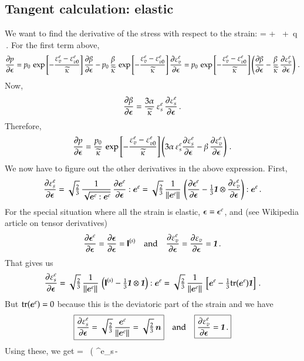 \documentclass[twoside,10pt,a4paper]{article}
\begin{document}
\subsection{Tangent calculation: elastic}
We want to find the derivative of the stress with respect to the strain:
\Beq
   \Partial{\Bsig}{\Beps} = \Bone\otimes{} + 
      \,\BnT\otimes{} + 
      \,q\,\Partial{\BnT}{\Beps}  \,.
\Eeq
For the first term above,
\[
   \Partial{p}{\Beps} = p_0\,\exp\left[-\frac{\Ve^e_v - \Ve^e_{v0}}{\kappatilde}\right]\Partial{\beta}{\Beps}
      - p_0\,\frac{\beta}{\kappatilde}\,
        \exp\left[-\frac{\Ve^e_v - \Ve^e_{v0}}{\kappatilde}\right]\Partial{\Ve^e_v}{\Beps} 
     = p_0\,\exp\left[-\frac{\Ve^e_v - \Ve^e_{v0}}{\kappatilde}\right]\left(\Partial{\beta}{\Beps} -
            \frac{\beta}{\kappatilde}\,\Partial{\Ve^e_v}{\Beps} \right) \,.
\]
Now,
\[
   \Partial{\beta}{\Beps} = \frac{3\alpha}{\kappatilde}\,\Ve^e_s\,\Partial{\Ve^e_s}{\Beps} \,.
\]
Therefore, 
\[
  \Partial{p}{\Beps} = \frac{p_0}{\kappatilde}\,
      \exp\left[-\frac{\Ve^e_v - \Ve^e_{v0}}{\kappatilde}\right]\left(3\alpha\,\Ve^e_s\Partial{\Ve^e_s}{\Beps} -
            \beta\,\Partial{\Ve^e_v}{\Beps} \right) \,.
\]
We now have to figure out the other derivatives in the above expression.  First,
\[
  \Partial{\Ve^e_s}{\Beps} = \sqrt{\tfrac{2}{3}}\,\frac{1}{\sqrt{\BeT^e:\BeT^e}}\,\Partial{\BeT^e}{\Beps}:\BeT^e =
     \sqrt{\tfrac{2}{3}}\,\frac{1}{\Norm{\BeT^e}{}}\,
     \left(\Partial{\Beps^e}{\Beps} - \tfrac{1}{3}\Bone\otimes\Partial{\Ve^e_v}{\Beps} \right):\BeT^e\,.
\]
For the special situation where all the strain is elastic, $\Beps = \Beps^e$, and (see Wikipedia 
article on tensor derivatives)
\[
  \Partial{\Beps^e}{\Beps} = \Partial{\Beps}{\Beps} = \SfI^{(s)} \quad \Tand \quad
  \Partial{\Ve^e_v}{\Beps} = \Partial{\Ve_v}{\Beps} = \Bone \,.
\]
That gives us
\[
  \Partial{\Ve^e_s}{\Beps} = \sqrt{\tfrac{2}{3}}\,\frac{1}{\Norm{\BeT^e}{}}\,
     \left(\SfI^{(s)} - \tfrac{1}{3}\Bone\otimes\Bone \right):\BeT^e
   = \sqrt{\tfrac{2}{3}}\,\frac{1}{\Norm{\BeT^e}{}}\,
     \left[\BeT^e - \tfrac{1}{3}\Tr(\BeT^e)\Bone\right] \,.
\]
But $\Tr(\BeT^e)=0$ because this is the deviatoric part of the strain and we have
\[
  \boxed{
  \Partial{\Ve^e_s}{\Beps} = \sqrt{\tfrac{2}{3}}\,\frac{\BeT^e}{\Norm{\BeT^e}{}} = \sqrt{\tfrac{2}{3}}\,\BnT 
  }
  \quad \Tand \quad
  \boxed{
  \Partial{\Ve^e_v}{\Beps} = \Bone \,.
  }
\]
Using these, we get
\Beq
   = \,
      \exp{}\left(\,\alpha\,\Ve^e_s\,\BnT -
\end{document}
